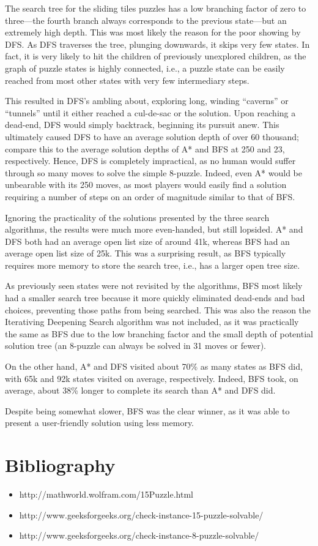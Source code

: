 \documentclass{article}
\begin{document}
  The search tree for the sliding tiles puzzles has a low branching factor of
  zero to three---the fourth branch always corresponds to the previous
  state---but an extremely high depth. This was most likely the reason for the
  poor showing by DFS. As DFS traverses the tree, plunging downwards, it skips
  very few states. In fact, it is very likely to hit the children of previously
  unexplored children, as the graph of puzzle states is highly connected, i.e.,
  a puzzle state can be easily reached from most other states with very few
  intermediary steps.

  This resulted in DFS's ambling about, exploring long, winding ``caverns'' or
  ``tunnels'' until it either reached a cul-de-sac or the solution. Upon
  reaching a dead-end, DFS would simply backtrack, beginning its pursuit anew.
  This ultimately caused DFS to have an average solution depth of over 60
  thousand; compare this to the average solution depths of A* and BFS at
  250 and 23, respectively. Hence, DFS is completely impractical, as no human
  would suffer through so many moves to solve the simple 8-puzzle. Indeed, even
  A* would be unbearable with its 250 moves, as most players would easily find a
  solution requiring a number of steps on an order of magnitude similar to that
  of BFS.

  Ignoring the practicality of the solutions presented by the three search
  algorithms, the results were much more even-handed, but still lopsided.
  A* and DFS both had an average open list size of around 41k, whereas BFS had
  an average open list size of 25k. This was a surprising result, as BFS
  typically requires more memory to store the search tree, i.e., has a larger
  open tree size.

  As previously seen states were not revisited by the algorithms, BFS most
  likely had a smaller search tree because it more quickly eliminated dead-ends
  and bad choices, preventing those paths from being searched. This was also the
  reason the Iterativing Deepening Search algorithm was not included, as it was
  practically the same as BFS due to the low branching factor and the small
  depth of potential solution tree (an 8-puzzle can always be solved in 31 moves
  or fewer).

  On the other hand, A* and DFS visited about 70\% as many states as BFS did,
  with 65k and 92k states visited on average, respectively. Indeed, BFS took,
  on average, about 38\% longer to complete its search than A* and DFS did.

  Despite being somewhat slower, BFS was the clear winner, as it was able to
  present a user-friendly solution using less memory.

\vfill
\section*{Bibliography}
  \begin{itemize}
    \item http://mathworld.wolfram.com/15Puzzle.html
    \item http://www.geeksforgeeks.org/check-instance-15-puzzle-solvable/
    \item http://www.geeksforgeeks.org/check-instance-8-puzzle-solvable/
  \end{itemize}
\end{document}
